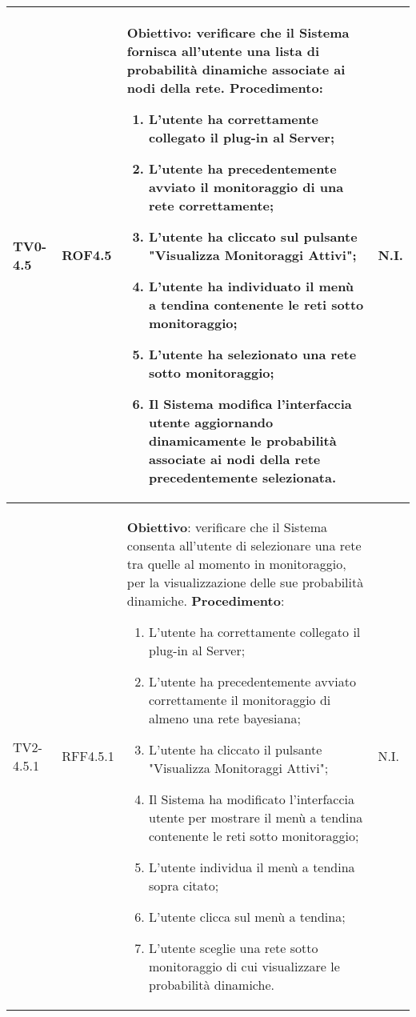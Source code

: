 \begin{longtable}{|C{.15\textwidth}|C{.13\textwidth}|m{.65\textwidth}|C{.08\textwidth}|}
TV0-4.5 & ROF4.5 &
	\textbf{Obiettivo}: verificare che il Sistema fornisca all'utente una lista di probabilità dinamiche associate ai nodi della rete. \newline
	\textbf{Procedimento}:
	\begin{enumerate}	
		\item L'utente ha correttamente collegato il plug-in al Server;
		\item L'utente ha precedentemente avviato il monitoraggio di una rete correttamente;
		\item L'utente ha cliccato sul pulsante "Visualizza Monitoraggi Attivi";
		\item L'utente ha individuato il menù a tendina contenente le reti sotto monitoraggio;
		\item L'utente ha selezionato una rete sotto monitoraggio;
		\item Il Sistema modifica l'interfaccia utente aggiornando dinamicamente le probabilità associate ai nodi della rete precedentemente selezionata.
	\end{enumerate}
	& N.I. \\
\hline

TV2-4.5.1 & RFF4.5.1 &
	\textbf{Obiettivo}: verificare che il Sistema consenta all'utente di selezionare una rete tra quelle al momento in monitoraggio, per la visualizzazione delle sue probabilità dinamiche. \newline
	\textbf{Procedimento}:
	\begin{enumerate}
		\item L'utente ha correttamente collegato il plug-in al Server;
		\item L'utente ha precedentemente avviato correttamente il monitoraggio di almeno una rete bayesiana;
		\item L'utente ha cliccato il pulsante "Visualizza Monitoraggi Attivi";
		\item Il Sistema ha modificato l'interfaccia utente per mostrare il menù a tendina contenente le reti sotto monitoraggio;
		\item L'utente individua il menù a tendina sopra citato;
		\item L'utente clicca sul menù a tendina;
		\item L'utente sceglie una rete sotto monitoraggio di cui visualizzare le probabilità dinamiche.
	\end{enumerate}
	& N.I. \\
\hline


\end{longtable}
